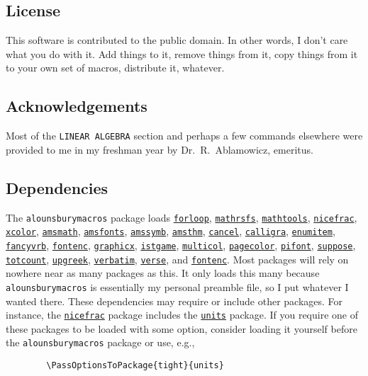 \documentclass[12pt]{article}
\begin{document}
    \subsection{License}
    This software is contributed to the public domain. In other words, I don't care what you do with it. Add things to it, remove things from it, copy things from it to your own set of macros, distribute it, whatever. 

    \subsection{Acknowledgements}
    Most of the \texttt{LINEAR ALGEBRA} section and perhaps a few commands elsewhere were provided to me in my freshman year by Dr.\ R.\ Ablamowicz, emeritus. 

    \subsection{Dependencies}
    The \texttt{alounsburymacros} package loads 
    \href{https://ctan.org/pkg/forloop}{\texttt{forloop}}, 
    \href{https://ctan.org/pkg/mathrsfs}{\texttt{mathrsfs}}, 
    \href{https://ctan.org/pkg/mathtools}{\texttt{mathtools}}, 
    \href{https://ctan.org/pkg/nicefrac}{\texttt{nicefrac}}, 
    \href{https://ctan.org/pkg/xcolor}{\texttt{xcolor}}, 
    \href{https://ctan.org/pkg/amsmath}{\texttt{amsmath}}, 
    \href{https://ctan.org/pkg/amsfonts}{\texttt{amsfonts}}, 
    \href{https://ctan.org/pkg/amsfonts}{\texttt{amssymb}}, 
    \href{https://ctan.org/pkg/amsthm}{\texttt{amsthm}}, 
    \href{https://ctan.org/pkg/cancel}{\texttt{cancel}}, 
    \href{https://ctan.org/pkg/calligra}{\texttt{calligra}}, 
    \href{https://ctan.org/pkg/enumitem}{\texttt{enumitem}}, 
    \href{https://ctan.org/pkg/fancyvrb}{\texttt{fancyvrb}}, 
    \href{https://ctan.org/pkg/fontenc}{\texttt{fontenc}}, 
    \href{https://ctan.org/pkg/graphicx}{\texttt{graphicx}}, 
    \href{https://ctan.org/pkg/istgame}{\texttt{istgame}}, 
    \href{https://ctan.org/pkg/multicol}{\texttt{multicol}}, 
    \href{https://ctan.org/pkg/pagecolor}{\texttt{pagecolor}},  
    \href{https://ctan.org/pkg/pifont}{\texttt{pifont}},  
    \href{https://ctan.org/pkg/suppose}{\texttt{suppose}},  
    \href{https://ctan.org/pkg/totcount}{\texttt{totcount}},  
    \href{https://ctan.org/pkg/upgreek}{\texttt{upgreek}},  
    \href{https://ctan.org/pkg/verbatim}{\texttt{verbatim}},  
    \href{https://ctan.org/pkg/verse}{\texttt{verse}}, and 
    \href{https://ctan.org/pkg/fontenc}{\texttt{fontenc}}.
    Most packages will rely on nowhere near as many packages as this. It only loads this many because \texttt{alounsburymacros} is essentially my personal preamble file, so I put whatever I wanted there. \p
    These dependencies may require or include other packages. For instance, the \href{https://ctan.org/pkg/nicefrac}{\texttt{nicefrac}} package includes the \href{https://ctan.org/pkg/units}{\texttt{units}} package. If you require one of these packages to be loaded with some option, consider loading it yourself before the \texttt{alounsburymacros} package or use, e.g., 
    \begin{Verbatim}
        \PassOptionsToPackage{tight}{units}
    \end{Verbatim}
\end{document}
